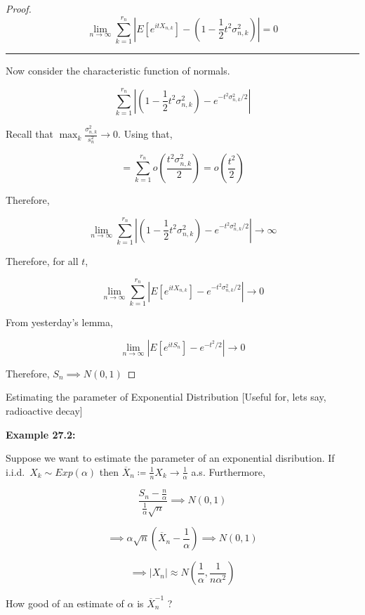 \documentclass{article}
\theoremstyle{definition}
\begin{document}
\begin{proof}
    \[
        \lim_{n \to \infty} \sum_{k=1}^{r_n} \left\vert E[e^{itX_{n,k}}]  - \left( 1 - \frac{1}{2}t^2 \sigma ^2_{n,k} \right) \right\vert = 0
    \]

    \hrule
    \hfil

    Now consider the characteristic function of normals.

    \[
        \sum_{k=1}^{r_n} \left\vert \left( 1 - \frac{1}{2}t^2 \sigma _{n,k}^2 \right) - e^{-t^2 \sigma_{n,k}^2 / 2} \right\vert 
    \]

    Recall that \(\max_k \frac{\sigma_{n,k}^2}{s_n^2}\to 0\). Using that, 

    \[
        = \sum_{k=1}^{r_n} o \left( \frac{t^2 \sigma_{n,k}^2}{2} \right) = o \left( \frac{t^2}{2} \right) 
    \]

    Therefore,

    \[
        \lim_{n \to \infty} \sum_{k=1}^{r_n} \left\vert \left( 1 - \frac{1}{2}t^2 \sigma _{n,k}^2 \right) - e^{-t^2 \sigma_{n,k}^2 / 2} \right\vert \to \infty
    \]

    Therefore, for all \(t\),
    
    \[
        \lim_{n \to \infty} \sum_{k=1}^{r_n} \left\vert E[e^{itX_{n,k}}] - e^{-t^2 \sigma _{n,k}^2 / 2} \right\vert \to 0
    \]

    From yesterday's lemma,

    \[
        \lim_{n \to \infty} \left\vert E[e^{it S_n}] - e^{-t^2 / 2} \right\vert \to 0
    \]

    Therefore, \(S_n \implies N(0,1)\) 

\end{proof}

Estimating the parameter of Exponential Distribution [Useful for, lets say, radioactive decay]

\textbf{Example 27.2:} 

Suppose we want to estimate the parameter of an exponential disribution. If i.i.d.\ \(X_k \sim Exp(\alpha)\) then \(\overline{X}_n \coloneqq \frac{1}{n}X_k \to \frac{1}{\alpha}\) a.s. Furthermore,

\[
    \frac{S_n - \frac{n}{\alpha}}{\frac{1}{\alpha}\sqrt{n} } \implies N(0,1)
\]

\[
    \implies \alpha \sqrt{n} \left( \overline{X} _n - \frac{1}{\alpha} \right) \implies N(0,1) 
\]

\[
    \implies \vert X_n \vert \approx N \left( \frac{1}{\alpha}, \frac{1}{n \alpha ^2} \right) 
\]

How good of an estimate of \(\alpha\) is \(\overline{X}_n^{-1}\) ?
\end{document}
